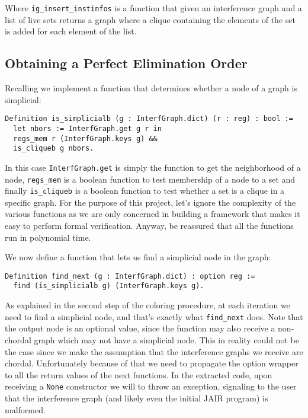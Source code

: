 Where \texttt{ig\_insert\_instinfos} is a function that given an interference graph and a list of live sets returns a graph where a clique containing the elements of the set is added for each element of the list.

\subsection{Obtaining a Perfect Elimination Order}
\label{subsec:peo}

Recalling  we implement a function that determines whether a node of a graph is simplicial:

\begin{lstlisting}[style=Rocq]
Definition is_simplicialb (g : InterfGraph.dict) (r : reg) : bool :=
  let nbors := InterfGraph.get g r in
  regs_mem r (InterfGraph.keys g) &&
  is_cliqueb g nbors.
\end{lstlisting}

In this case \texttt{InterfGraph.get} is simply the function to get the neighborhood of a node, \texttt{regs\_mem} is a boolean function to test membership of a node to a set and finally \texttt{is\_cliqueb} is a boolean function to test whether a set is a clique in a specific graph.
For the purpose of this project, let's ignore the complexity of the various functions as we are only concerned in building a framework that makes it easy to perform formal verification. Anyway, be reassured that all the functions run in polynomial time.

We now define a function that lets us find a simplicial node in the graph:

\begin{lstlisting}[style=Rocq]
Definition find_next (g : InterfGraph.dict) : option reg :=
  find (is_simplicialb g) (InterfGraph.keys g).
\end{lstlisting}

As explained in the second step of the coloring procedure, at each iteration we need to find a simplicial node, and that's exactly what \texttt{find\_next} does. Note that the output node is an optional value, since the function may also receive a non-chordal graph which may not have a simplicial node. This in reality could not be the case since we make the assumption that the interference graphs we receive are chordal. Unfortunately because of that we need to propagate the option wrapper to all the return values of the next functions.
In the extracted code, upon receiving a \texttt{None} constructor we will to throw an exception, signaling to the user that the interference graph (and likely even the initial JAIR program) is malformed.

